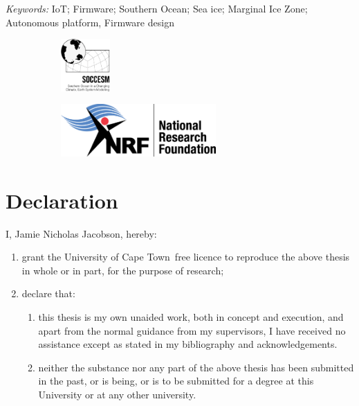\documentclass[a4paper, 12pt, oneside, openright, parskip=full]{book}
\newcommand{\auth}{Jamie Nicholas Jacobson}								%
\newcommand{\uni}{University of Cape Town}				%
\newcommand{\key}{IoT; Firmware; Southern Ocean; Sea ice; Marginal Ice Zone; Autonomous platform, Firmware design}					   %
\begin{document}
\begin{titlepage}
		\vskip 5mm	
	\begin{normalsize}			
		{\itshape Keywords:}
		\key			
	\end{normalsize}

	\begin{figure}[H]
			\begin{subfigure}[b]{0.5\textwidth}
				\raggedright
				\includegraphics[height=2cm]{soccesm-logo.png}
			\end{subfigure}%
					\begin{subfigure}[b]{0.5\textwidth}
			\raggedleft
			\includegraphics[height=2cm]{NRF LOGO.png}
		\end{subfigure}%

	\end{figure}
\thispagestyle{empty}
\end{titlepage}

\frontmatter
\chapter{Declaration}				
\label{ch:decl}
I, \auth,  hereby:

\begin{enumerate}
	\item		grant the \uni\  free licence to reproduce the above thesis in whole or in part, for the purpose of research;
	\item		declare that:
	
	\begin{enumerate}
		\item		this thesis is my own unaided work, both in concept and execution, and apart from the normal guidance from my supervisors, I have received no assistance except as stated in my bibliography and acknowledgements.

		\item		neither the substance nor any part of the above thesis has been submitted in the past, or is being, or is to be submitted for a degree at this University or at any other university.
	\end{enumerate}	
\end{enumerate}
\end{document}
